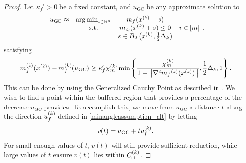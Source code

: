 \begin{proof}

Let $\kappa_f' > 0$ be a fixed constant, and $u_{\textrm{GC}}$ be any approximate solution to 
\begin{align*}
\begin{array}{cccc}
u_{\textrm{GC}} \approx & \operatorname*{arg\,min}_{s \in \mathbb R^n} & m_{f}(x^{(k)} + s) & \\
& \textrm{s.t.} & m_{c_i}(x^{(k)} + s) \le 0 & i \in [m]\\
& & s \in B_2\left(x^{(k)}, \frac 1 2 \Delta_k\right) & \\
\end{array}.
\end{align*}
satisfying
\begin{align}
\label{what_ugc_satisfies}
m_f^{(k)}(x^{(k)}) - m_f^{(k)}(u_{\textrm{GC}}) \ge \kappa_f' {\chi_m^{(k)}} \min\left\{ \frac{{\chi_m^{(k)}}}{1+\left\|\nabla^2 {{m}_f}^{(k)}(x^{(k)})\right\|}, \frac 1 2 \Delta_k, 1 \right\}.
\end{align}
This can be done by using the Generalized Cauchy Point as described in \cite[Section 12.2.1]{Conn:2000:TM:357813}.
We wish to find a point within the buffered region that provides a percentage of the decrease $u_{\textrm{GC}}$ provides.
To accomplish this, we move from $u_{\textrm{GC}}$ a distance $t$ along the direction ${u^{(k)}_f}$ defined in \cref{minangleassumption_alt} by letting 
\begin{align*}
v(t) = u_{\textrm{GC}} + t {u^{(k)}_f}.
\end{align*}
For small enough values of $t$, $v(t)$ will still provide sufficient reduction,
while large values of $t$ ensure $v(t)$ lies within ${C^{(k)}_{\cap}}$.


\end{proof}

